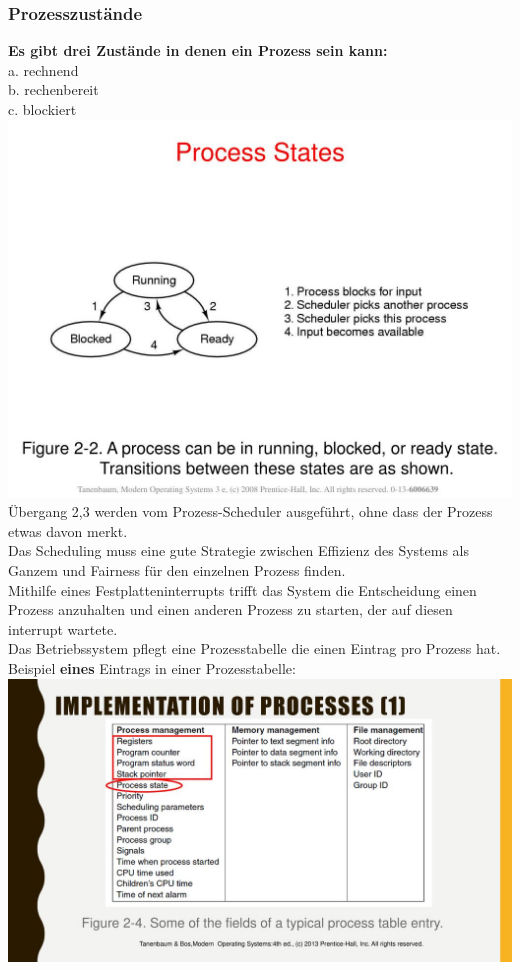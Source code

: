 \documentclass[12pt,a4paper]{univention}
\begin{document}
\subsubsection{Prozesszustände}
\textbf{Es gibt drei Zustände in denen ein Prozess sein kann:}\\
a. rechnend\\
b. rechenbereit\\
c. blockiert\\
\includegraphics[scale=0.5]{prozesszustaende.jpg}\\
Übergang 2,3 werden vom Prozess-Scheduler ausgeführt, ohne dass der Prozess etwas davon merkt.\\
Das Scheduling muss eine gute Strategie zwischen Effizienz des Systems als Ganzem und Fairness für den einzelnen Prozess finden.\\
Mithilfe eines Festplatteninterrupts trifft das System die Entscheidung einen Prozess anzuhalten und einen anderen Prozess zu starten, der auf diesen interrupt wartete.\\
Das Betriebssystem pflegt eine Prozesstabelle die einen Eintrag pro Prozess hat.\\
Beispiel \textbf{eines} Eintrags in einer Prozesstabelle:\\
\includegraphics[scale=1]{prozesstabelle.jpg}\\
\end{document}
